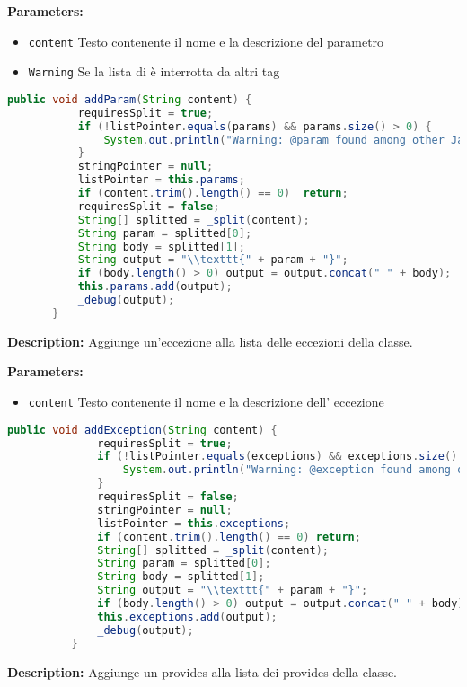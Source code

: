 \textbf{Parameters:}
\begin{itemize}
  \item\texttt{content} Testo contenente il nome e la descrizione del parametro  
  \item\texttt{Warning} Se la lista di è interrotta da altri  tag
\end{itemize}

\begin{lstlisting}[language=Java]
       public void addParam(String content) {
           requiresSplit = true;
           if (!listPointer.equals(params) && params.size() > 0) {
               System.out.println("Warning: @param found among other Javadoc keywords. You should put all paramaters together.");
           }
           stringPointer = null;
           listPointer = this.params;
           if (content.trim().length() == 0)  return;
           requiresSplit = false;
           String[] splitted = _split(content);
           String param = splitted[0];
           String body = splitted[1];
           String output = "\\texttt{" + param + "}";
           if (body.length() > 0) output = output.concat(" " + body);
           this.params.add(output);
           _debug(output);
       }
\end{lstlisting}
\textbf{Description:}  Aggiunge un'eccezione alla lista delle eccezioni della classe. 

\textbf{Parameters:}
\begin{itemize}
  \item\texttt{content} Testo contenente il nome e la descrizione dell' eccezione  
\end{itemize}

\begin{lstlisting}[language=Java]
          public void addException(String content) {
              requiresSplit = true;
              if (!listPointer.equals(exceptions) && exceptions.size() > 0) {
                  System.out.println("Warning: @exception found among other Javadoc keywords. You should put all exceptions together.");
              }
              requiresSplit = false;
              stringPointer = null;
              listPointer = this.exceptions;
              if (content.trim().length() == 0) return;
              String[] splitted = _split(content);
              String param = splitted[0];
              String body = splitted[1];
              String output = "\\texttt{" + param + "}";
              if (body.length() > 0) output = output.concat(" " + body);
              this.exceptions.add(output);
              _debug(output);
          }
\end{lstlisting}
\textbf{Description:}  Aggiunge un provides alla lista dei provides della classe. 

